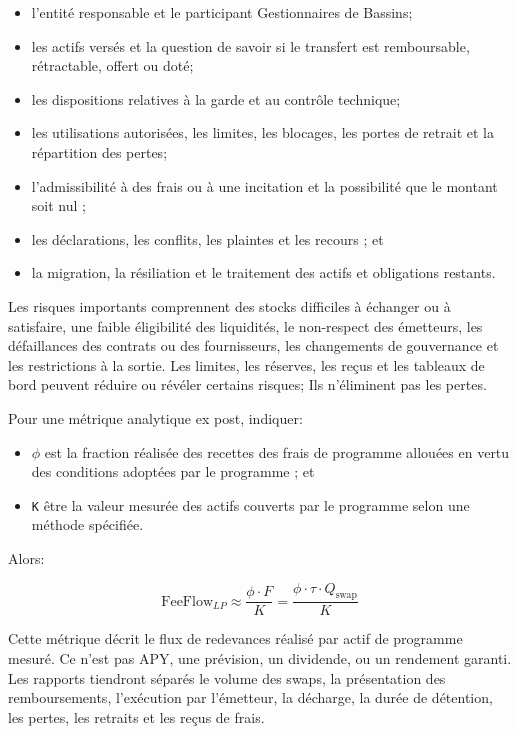 \documentclass[11pt]{article}
\begin{document}
\begin{itemize}[leftmargin=*]
\item l'entité responsable et le participant Gestionnaires de Bassins;
\item les actifs versés et la question de savoir si le transfert est remboursable, rétractable, offert ou doté;
\item les dispositions relatives à la garde et au contrôle technique;
\item les utilisations autorisées, les limites, les blocages, les portes de retrait et la répartition des pertes;
\item l'admissibilité à des frais ou à une incitation et la possibilité que le montant soit nul ;
\item les déclarations, les conflits, les plaintes et les recours ; et
\item la migration, la résiliation et le traitement des actifs et obligations restants.
\end{itemize}
Les risques importants comprennent des stocks difficiles à échanger ou à satisfaire, une faible éligibilité des liquidités, le non-respect des émetteurs, les défaillances des contrats ou des fournisseurs, les changements de gouvernance et les restrictions à la sortie. Les limites, les réserves, les reçus et les tableaux de bord peuvent réduire ou révéler certains risques; Ils n'éliminent pas les pertes.

Pour une métrique analytique ex post, indiquer:

\begin{itemize}[leftmargin=*]
\item \texttt{$\phi$} est la fraction réalisée des recettes des frais de programme allouées en vertu des conditions adoptées par le programme ; et
\item \texttt{K} être la valeur mesurée des actifs couverts par le programme selon une méthode spécifiée.
\end{itemize}
Alors:

\[
\mathrm{FeeFlow}_{LP} \approx \frac{\phi \cdot F}{K} = \frac{\phi \cdot \tau \cdot Q_{\mathrm{swap}}}{K}
\]

Cette métrique décrit le flux de redevances réalisé par actif de programme mesuré. Ce n'est pas APY, une prévision, un dividende, ou un rendement garanti. Les rapports tiendront séparés le volume des swaps, la présentation des remboursements, l'exécution par l'émetteur, la décharge, la durée de détention, les pertes, les retraits et les reçus de frais.
\end{document}
